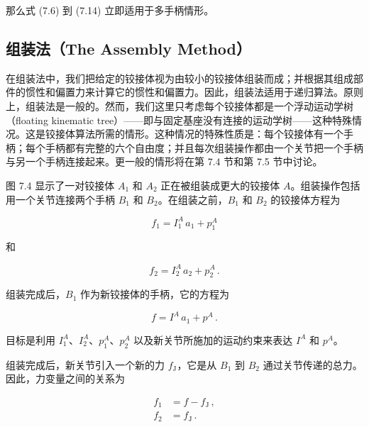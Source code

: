 \documentclass[10pt,a4paper]{book}
\theoremstyle{thmstyle} %
\theoremstyle{defstyle} %
\theoremstyle{prostyle} %
\begin{document}
那么式 (7.6) 到 (7.14) 立即适用于多手柄情形。



\subsection{组装法（The Assembly Method）}





在组装法中，我们把给定的铰接体视为由较小的铰接体组装而成；并根据其组成部件的惯性和偏置力来计算它的惯性和偏置力。因此，组装法适用于递归算法。原则上，组装法是一般的。然而，我们这里只考虑每个铰接体都是一个浮动运动学树（floating kinematic tree）——即与固定基座没有连接的运动学树——这种特殊情况。这是铰接体算法所需的情形。这种情况的特殊性质是：每个铰接体有一个手柄；每个手柄都有完整的六个自由度；并且每次组装操作都由一个关节把一个手柄与另一个手柄连接起来。更一般的情形将在第 7.4 节和第 7.5 节中讨论。



图 7.4 显示了一对铰接体 $A_{1}$ 和 $A_{2}$ 正在被组装成更大的铰接体 $A$。组装操作包括用一个关节连接两个手柄 $B_{1}$ 和 $B_{2}$。在组装之前，$B_{1}$ 和 $B_{2}$ 的铰接体方程为



$$
f _ { 1 } = I _ { 1 } ^{A} \, a _ { 1 } + p _ { 1 } ^{A}
$$



和



$$
f _ { 2 } = I _ { 2 } ^{A} \, a _ { 2 } + p _ { 2 } ^{A} \, .
$$



组装完成后，$B_{1}$ 作为新铰接体的手柄，它的方程为



$$
f = I ^{A} \, a _ { 1 } + p ^{A} \, .
$$



目标是利用 $I_{1}^{A}$、$I_{2}^{A}$、$p_{1}^{A}$、$p_{2}^{A}$ 以及新关节所施加的运动约束来表达 $I^{A}$ 和 $p^{A}$。



组装完成后，新关节引入一个新的力 $f_{\mathrm{J}}$，它是从 $B_{1}$ 到 $B_{2}$ 通过关节传递的总力。因此，力变量之间的关系为



$$
\begin{array}{rl} { f _ { 1 } } & { = f - f _ { \mathrm { J } } \, , } \\{ f _ { 2 } } & { = f _ { \mathrm { J } } \, . } \end{array}
$$
\end{document}
